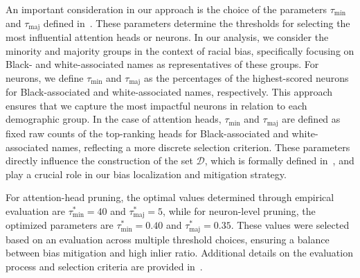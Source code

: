 An important consideration in our approach is the choice of the parameters $\tau_{\text{min}}$ and $\tau_{\text{maj}}$ defined in~. These parameters determine the thresholds for selecting the most influential attention heads or neurons. In our analysis, we consider the minority and majority groups in the context of racial bias, specifically focusing on Black- and white-associated names as representatives of these groups. 
For neurons, we define $\tau_{\text{min}}$ and $\tau_{\text{maj}}$ as the percentages of the highest-scored neurons for Black-associated and white-associated names, respectively. This approach ensures that we capture the most impactful neurons in relation to each demographic group. In the case of attention heads, $\tau_{\text{min}}$ and $\tau_{\text{maj}}$ are defined as fixed raw counts of the top-ranking heads for Black-associated and white-associated names, reflecting a more discrete selection criterion. 
These parameters directly influence the construction of the set $\mathcal{D}$, which is formally defined in~, and play a crucial role in our bias localization and mitigation strategy.





For attention-head pruning, the optimal values determined through empirical evaluation are $\tau_{\text{min}}^* = 40$ and $\tau_{\text{maj}}^* = 5$, while for neuron-level pruning, the optimized parameters are $\tau_{\text{min}}^* = 0.40$ and $\tau_{\text{maj}}^* = 0.35$. These values were selected based on an evaluation across multiple threshold choices, ensuring a balance between bias mitigation and high inlier ratio. Additional details on the evaluation process and selection criteria are provided in~.